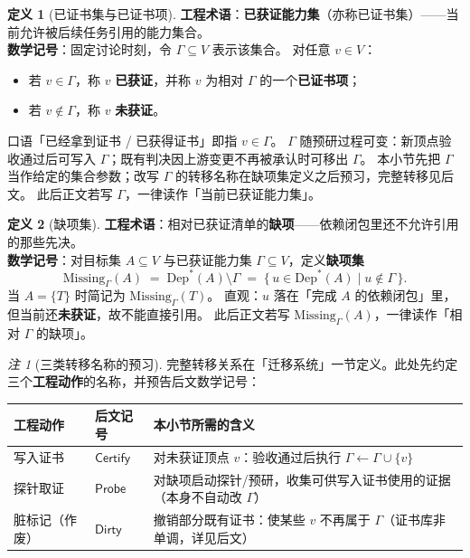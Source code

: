 \documentclass[UTF8,a4paper,11pt]{ctexart}
\theoremstyle{definition}
\newtheorem{definition}{定义}[section]
\theoremstyle{plain}
\theoremstyle{remark}
\newtheorem{remark}{注}[section]
\numberwithin{figure}{section}
\numberwithin{table}{section}
\begin{document}
\begin{definition}[已证书集与已证书项]
\label{def:gamma}
\textbf{工程术语}：\textbf{已获证能力集}（亦称已证书集）——当前允许被后续任务引用的能力集合。\\
\textbf{数学记号}：固定讨论时刻，令 $\Gamma\subseteq V$ 表示该集合。
对任意 $v\in V$：
\begin{itemize}
  \item 若 $v\in\Gamma$，称 $v$ \textbf{已获证}，并称 $v$ 为相对 $\Gamma$ 的一个\textbf{已证书项}；
  \item 若 $v\notin\Gamma$，称 $v$ \textbf{未获证}。
\end{itemize}
口语「已经拿到证书 / 已获得证书」即指 $v\in\Gamma$。
$\Gamma$ 随预研过程可变：新顶点验收通过后可写入 $\Gamma$；既有判决因上游变更不再被承认时可移出 $\Gamma$。
本小节先把 $\Gamma$ 当作给定的集合参数；改写 $\Gamma$ 的转移名称在缺项集定义之后预习，完整转移见后文。
此后正文若写 $\Gamma$，一律读作「当前已获证能力集」。
\end{definition}

\begin{definition}[缺项集]
\label{def:missing}
\textbf{工程术语}：相对已获证清单的\textbf{缺项}——依赖闭包里还不允许引用的那些先决。\\
\textbf{数学记号}：对目标集 $A\subseteq V$ 与已获证能力集 $\Gamma\subseteq V$，定义\textbf{缺项集}
\[
\mathrm{Missing}_\Gamma(A)
\;=\;
\mathrm{Dep}^*(A)\setminus\Gamma
\;=\;
\{\,u\in\mathrm{Dep}^*(A)\mid u\notin\Gamma\,\}.
\]
当 $A=\{T\}$ 时简记为 $\mathrm{Missing}_\Gamma(T)$。
直观：$u$ 落在「完成 $A$ 的依赖闭包」里，但当前还\textbf{未获证}，故不能直接引用。
此后正文若写 $\mathrm{Missing}_\Gamma(A)$，一律读作「相对 $\Gamma$ 的缺项」。
\end{definition}

\begin{remark}[三类转移名称的预习]
完整转移关系在「迁移系统」一节定义。此处先约定三个\textbf{工程动作}的名称，并预告后文数学记号：
\begin{center}
\begin{tabular}{@{}L{3.2cm}L{2.6cm}L{7.6cm}@{}}
  \toprule
  工程动作 & 后文记号 & 本小节所需的含义 \\
  \midrule
  写入证书 & $\mathsf{Certify}$ &
  对未获证顶点 $v$：验收通过后执行 $\Gamma\leftarrow\Gamma\cup\{v\}$ \\
  探针取证 & $\mathsf{Probe}$ &
  对缺项启动探针/预研，收集可供写入证书使用的证据（本身不自动改 $\Gamma$） \\
  脏标记（作废） & $\mathsf{Dirty}$ &
  撤销部分既有证书：使某些 $v$ 不再属于 $\Gamma$（证书库非单调，详见后文） \\
  \bottomrule
\end{tabular}
\end{center}
\end{remark}
\end{document}
